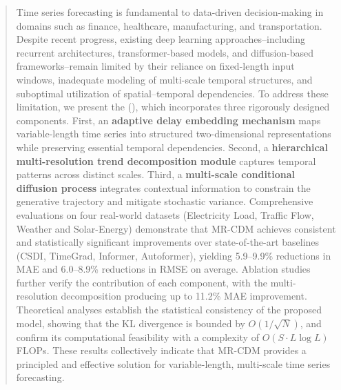 \begin{abstract}
Time series forecasting is fundamental  to data-driven decision-making in domains such as finance, healthcare, manufacturing, and transportation.
Despite recent progress, existing deep learning approaches--including recurrent architectures, transformer-based models, and diffusion-based frameworks--remain limited by their reliance on fixed-length input windows, inadequate modeling of multi-scale temporal structures, and suboptimal utilization of spatial–temporal dependencies.
To address these limitation, we present the \solutionTotalName{} (\solutionSimpleName{}), which incorporates three rigorously designed components. 
First, an \textbf{adaptive delay embedding mechanism} maps variable-length time series into structured two-dimensional representations while preserving essential temporal dependencies. 
Second, a \textbf{hierarchical multi-resolution trend decomposition module} captures temporal patterns across distinct scales.
Third, a \textbf{multi-scale conditional diffusion process} integrates contextual information to constrain the generative trajectory and mitigate stochastic variance. 
Comprehensive evaluations on four real-world datasets (Electricity Load, Traffic Flow, Weather and Solar-Energy) demonstrate that MR-CDM  achieves consistent and statistically significant improvements over state-of-the-art baselines (CSDI, TimeGrad, Informer, Autoformer), yielding 5.9–9.9\% reductions in MAE and 6.0–8.9\% reductions in RMSE on average. 
Ablation studies further verify the contribution of each component, with the multi-resolution decomposition producing up to 11.2\% MAE improvement. 
Theoretical analyses establish the statistical consistency of the proposed model, showing that the KL divergence is bounded by $O(1/\sqrt{N})$, and confirm its computational feasibility with a complexity of $O(S \cdot L \log L)$ FLOPs.
These results collectively indicate that MR-CDM provides a principled and effective solution for variable-length, multi-scale time series forecasting.
\end{abstract}